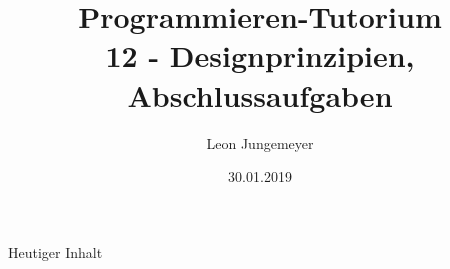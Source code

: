 \documentclass[18pt]{beamer}
\title[Programmieren-Tutorium]{Programmieren-Tutorium\\ 12 - Designprinzipien, Abschlussaufgaben}
\author{Leon Jungemeyer}
\date{30.01.2019}
\institute{Institut für Programmstrukturen und Datenorganisation}
\begin{document}

\begin{frame}
\titlepage
\end{frame}

\begin{frame}{Heutiger Inhalt}
\tableofcontents[sections={1-3}]
\end{frame}

\end{document}
